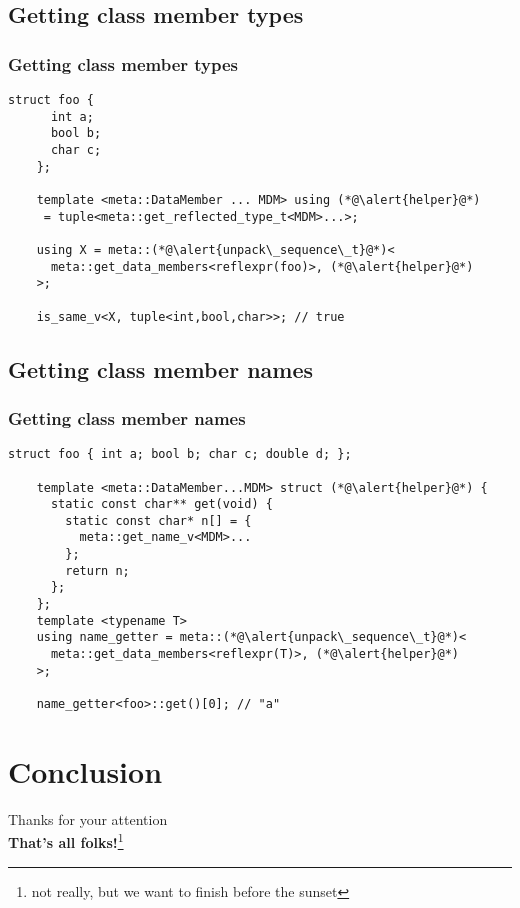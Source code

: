 \documentclass[compress,table,xcolor=table]{beamer}
\begin{document}
\subsection{Getting class member types}
\begin{frame}[fragile]
\frametitle{Getting class member types}
\begin{lstlisting}[basicstyle=\small\ttfamily]
	struct foo {
	  int a;
	  bool b;
	  char c;
	};

	template <meta::DataMember ... MDM> using (*@\alert{helper}@*)
	 = tuple<meta::get_reflected_type_t<MDM>...>;

	using X = meta::(*@\alert{unpack\_sequence\_t}@*)<
	  meta::get_data_members<reflexpr(foo)>, (*@\alert{helper}@*)
	>;

	is_same_v<X, tuple<int,bool,char>>; // true
\end{lstlisting}
\end{frame}

\subsection{Getting class member names}
\begin{frame}[fragile]
\frametitle{Getting class member names}
\begin{lstlisting}[basicstyle=\small\ttfamily]
	struct foo { int a; bool b; char c; double d; };

	template <meta::DataMember...MDM> struct (*@\alert{helper}@*) {
	  static const char** get(void) {
	    static const char* n[] = {
	      meta::get_name_v<MDM>...
	    };
	    return n;
	  };
	};
	template <typename T>
	using name_getter = meta::(*@\alert{unpack\_sequence\_t}@*)<
	  meta::get_data_members<reflexpr(T)>, (*@\alert{helper}@*)
	>;

	name_getter<foo>::get()[0]; // "a"
\end{lstlisting}
\end{frame}

\section{Conclusion}

\begin{frame}
\begin{center}
\Huge
Thanks for your attention\\
\textbf{That's all folks!}\footnote{not really, but we want to finish before the sunset}
\end{center}
\end{frame}
\end{document}
